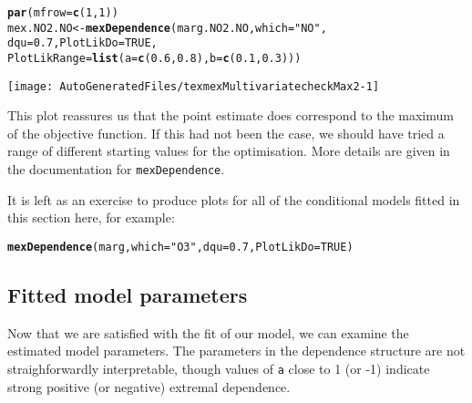 \documentclass[10pt]{article}\usepackage[]{graphicx}\usepackage[]{color}
\makeatletter
\def\maxwidth{ %
  \ifdim\Gin@nat@width>\linewidth
    \linewidth
  \else
    \Gin@nat@width
  \fi
}
\newcommand{\hlnum}[1]{\textcolor[rgb]{0.686,0.059,0.569}{#1}}%
\newcommand{\hlstr}[1]{\textcolor[rgb]{0.192,0.494,0.8}{#1}}%
\newcommand{\hlstd}[1]{\textcolor[rgb]{0.345,0.345,0.345}{#1}}%
\newcommand{\hlkwb}[1]{\textcolor[rgb]{0.69,0.353,0.396}{#1}}%
\newcommand{\hlkwc}[1]{\textcolor[rgb]{0.333,0.667,0.333}{#1}}%
\newcommand{\hlkwd}[1]{\textcolor[rgb]{0.737,0.353,0.396}{\textbf{#1}}}%
\newenvironment{kframe}{%
 \def\at@end@of@kframe{}%
 \ifinner\ifhmode%
  \def\at@end@of@kframe{\end{minipage}}%
  \begin{minipage}{\columnwidth}%
 \fi\fi%
 \def\FrameCommand##1{\hskip\@totalleftmargin \hskip-\fboxsep
 \colorbox{shadecolor}{##1}\hskip-\fboxsep
     \hskip-\linewidth \hskip-\@totalleftmargin \hskip\columnwidth}%
 \MakeFramed {\advance\hsize-\width
   \@totalleftmargin\z@ \linewidth\hsize
   \@setminipage}}%
 {\par\unskip\endMakeFramed%
 \at@end@of@kframe}
\newenvironment{knitrout}{}{} %
\makeatother
\begin{document}
\begin{knitrout}
\color{fgcolor}\begin{kframe}
\begin{alltt}
\hlkwd{par}\hlstd{(}\hlkwc{mfrow}\hlstd{=}\hlkwd{c}\hlstd{(}\hlnum{1}\hlstd{,}\hlnum{1}\hlstd{))}
\hlstd{mex.NO2.NO} \hlkwb{<-} \hlkwd{mexDependence}\hlstd{(marg.NO2.NO,} \hlkwc{which} \hlstd{=} \hlstr{"NO"}\hlstd{,}
                            \hlkwc{dqu}\hlstd{=}\hlnum{0.7}\hlstd{,} \hlkwc{PlotLikDo}\hlstd{=}\hlnum{TRUE}\hlstd{,}
                            \hlkwc{PlotLikRange}\hlstd{=}\hlkwd{list}\hlstd{(}\hlkwc{a}\hlstd{=}\hlkwd{c}\hlstd{(}\hlnum{0.6}\hlstd{,}\hlnum{0.8}\hlstd{),}\hlkwc{b}\hlstd{=}\hlkwd{c}\hlstd{(}\hlnum{0.1}\hlstd{,}\hlnum{0.3}\hlstd{) ))}
\end{alltt}
\end{kframe}
\texttt{[image: AutoGeneratedFiles/texmexMultivariatecheckMax2-1]} 

\end{knitrout}

This plot reassures us that the point estimate does correspond to the maximum of
the objective function.  If this had not been the case, we should have tried a
range of different starting values for the optimisation.  More details are given
in the documentation for {\tt mexDependence}.

It is left as an exercise to produce plots for all of the conditional models
fitted in this section here, for example:
\begin{knitrout}
\color{fgcolor}\begin{kframe}
\begin{alltt}
\hlkwd{mexDependence}\hlstd{(marg,}\hlkwc{which}\hlstd{=}\hlstr{"O3"}\hlstd{,}\hlkwc{dqu}\hlstd{=}\hlnum{0.7}\hlstd{,}\hlkwc{PlotLikDo}\hlstd{=}\hlnum{TRUE}\hlstd{)}
\end{alltt}
\end{kframe}
\end{knitrout}
%
\subsection{Fitted model parameters}
%
Now that we are satisfied with the fit of our model, we can examine the
estimated model parameters.  The parameters in the dependence structure are not
straighforwardly interpretable, though values of {\tt a} close to 1 (or -1)
indicate strong positive (or negative) extremal dependence.
\end{document}
